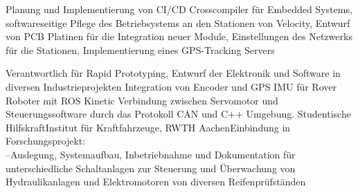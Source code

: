 \documentclass[
	a4paper,
    maincolor=myorange,
    sidecolor=myblack,
	sectioncolor=myblue,
	subsectioncolor=mygray!70,
	textcolor=myblue,
	profilepicsize=4.5cm,
	profilepicborderwidth=1,5pt,
	profilepicstyle=profilecircle,
	profilepiczoom=1,
	profilepicyshift=-3mm,
]{fortysecondscv}
\begin{document}
\makefrontsidebar
{}
\begin{cvtable}[2]
	{Planung und Implementierung von CI/CD Crosscompiler für Embedded Systems, softwareseitige Pflege des Betriebsystems an den Stationen von Velocity, Entwurf von PCB Platinen für die Integration neuer Module, Einstellungen des Netzwerks für die Stationen, Implementierung eines GPS-Tracking Servers}
	
	{Verantwortlich für Rapid Prototyping, Entwurf der Elektronik und Software in diversen Industrieprojekten}
	{Integration von Encoder und GPS IMU für Rover Roboter mit ROS Kinetic}
	{Verbindung zwischen Servomotor und Steuerungssoftware durch das Protokoll CAN und C++ Umgebung.}
	 {Studentische Hilfskraft}{Institut für Kraftfahrzeuge, RWTH Aachen}{Einbindung in Forschungsprojekt:\\
    --Auslegung, Systemaufbau, Inbetriebnahme und Dokumentation für unterschiedliche Schaltanlagen zur Steuerung und Überwachung von Hydraulikanlagen und Elektromotoren von diversen Reifenprüfständen}
	

\end{cvtable}

\end{document}
